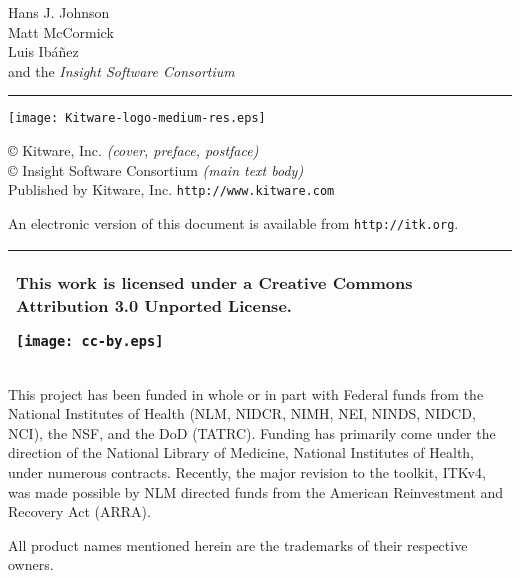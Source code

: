 \hfill
\begin{minipage}[t][6cm][b]{0.6\textwidth}
\Large
\renewcommand{\baselinestretch}{1.5}
Hans J. Johnson\\
Matt McCormick \\
Luis Ib\'{a}\~{n}ez\\
and the \emph{Insight Software Consortium}
\normalsize
\end{minipage}


\begin{minipage}[t][2cm][b]{\textwidth}
\rule{14cm}{1pt}
\end{minipage}

\newpage

\begin{minipage}[t][4cm][b]{\textwidth}
\begin{center}
\texttt{[image: Kitware-logo-medium-res.eps]}
\end{center}
\par
\begin{center}
\large

\copyright \the\year \; Kitware, Inc. \emph{(cover, preface, postface)}\\
\copyright \the\year \; Insight Software Consortium \emph{(main text body)}\\
Published by Kitware, Inc. \texttt{http://www.kitware.com}
\normalsize
\end{center}
\end{minipage}


\begin{minipage}[t][2.25cm][b]{\textwidth}
\begin{center}
An electronic version of this document is available from
\texttt{http://itk.org}.
\end{center}
\begin{tabular}{|p{}|}
\hline
This work is licensed under a Creative Commons Attribution 3.0 Unported License.
\begin{center}
\texttt{[image: cc-by.eps]}
\end{center}\\
\hline
\end{tabular}
\end{minipage}


\begin{minipage}[t][2.5cm][b]{\textwidth}
\begin{center}
This project has been funded in whole or in part with Federal funds from the
National Institutes of Health (NLM, NIDCR, NIMH, NEI, NINDS, NIDCD, NCI), the
NSF, and the DoD (TATRC). Funding has primarily come under the direction of the
National Library of Medicine, National Institutes of Health, under numerous
contracts. Recently, the major revision to the toolkit, ITKv4, was made
possible by NLM directed funds from the American Reinvestment and Recovery Act
(ARRA).
\end{center}
\end{minipage}


\begin{minipage}[t][1.0cm][b]{\textwidth}
\begin{center}
All product names mentioned herein are the trademarks of their respective
owners.
\end{center}
\end{minipage}
